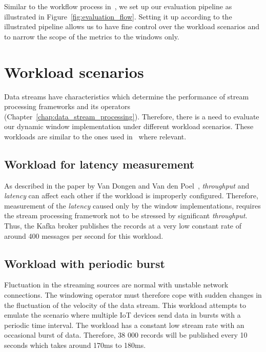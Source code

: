 Similar to the workflow process in~\cite{evalution_of_spe, benchmark_sce}, we set up
our evaluation pipeline as illustrated in Figure~\ref{fig:evaluation_flow}. Setting it 
up according to the illustrated pipeline allows us to have fine control over the 
workload scenarios and to narrow the scope of the metrics to the windows only. 




\section{Workload scenarios}
\label{sec:workload}
Data streams have characteristics 
which determine the performance of stream processing frameworks and its 
operators (Chapter~\ref{chap:data_stream_processing}). Therefore, 
there is a need to evaluate our dynamic window implementation under different workload scenarios. 
These workloads are similar to the ones used in~\cite{evalution_of_spe} where relevant.

\subsection{Workload for latency measurement}
As described in the paper by Van Dongen and Van den Poel~\cite{evalution_of_spe}, 
\emph{throughput} and \emph{latency} can affect each other if the workload is 
improperly configured. Therefore, measurement of the \emph{latency} caused only 
by the window implementations, requires the stream processing framework not to be 
stressed by significant \emph{throughput}. Thus, the Kafka broker 
publishes the records at a very low constant rate of around 400 messages per second for 
this workload. 


\subsection{Workload with periodic burst}
Fluctuation in the streaming sources are normal with unstable network connections. 
The windowing operator must therefore cope with sudden changes in the 
fluctuation of the velocity of the data stream. This workload attempts to emulate 
the scenario where multiple IoT devices send data in bursts with a periodic 
time interval. The workload has a constant low stream rate with an occasional 
burst of data. Therefore, 38 000 records will be published every 10 seconds which 
takes around 170ms to 180ms. 


